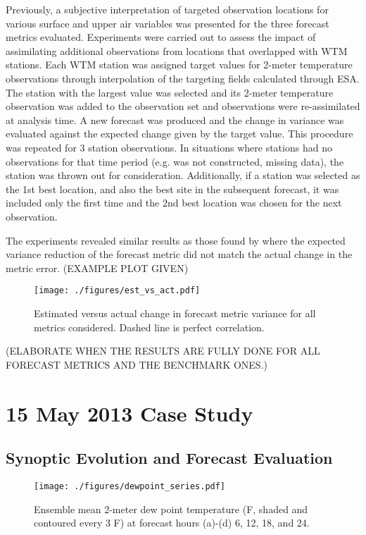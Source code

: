 \documentclass{ttuthes2007}
\newcommand{\tab}{\hspace*{2em}}  %
\begin{document}
\tab Previously, a subjective interpretation of targeted observation locations for various surface and upper air variables was presented for the three forecast metrics evaluated. Experiments were carried out to assess the impact of assimilating additional observations from locations that overlapped with WTM stations. Each WTM station was assigned target values for 2-meter temperature observations through interpolation of the targeting fields calculated through ESA. The station with the largest value was selected and its 2-meter temperature observation was added to the observation set and observations were re-assimilated at analysis time. A new forecast was produced and the change in variance was evaluated against the expected change given by the target value. This procedure was repeated for 3 station observations. In situations where stations had no observations for that time period (e.g. was not constructed, missing data), the station was thrown out for consideration. Additionally, if a station was selected as the 1st best location, and also the best site in the subsequent forecast, it was included only the first time and the 2nd best location was chosen for the next observation. 

\tab The experiments revealed similar results as those found by \cite{Hilletal2013} where the expected variance reduction of the forecast metric did not match the actual change in the metric error. (EXAMPLE PLOT GIVEN)

\begin{figure}[!tb]
  \centering
  \noindent\texttt{[image: ./figures/est\_vs\_act.pdf]}\\
  \caption{Estimated versus actual change in forecast metric variance for all metrics considered. Dashed line is perfect correlation. }
\label{est_vs_act}
\end{figure}

(ELABORATE WHEN THE RESULTS ARE FULLY DONE FOR ALL FORECAST METRICS AND THE BENCHMARK ONES.)

\chapter{15 May 2013 Case Study}

\section{Synoptic Evolution and Forecast Evaluation}

\begin{figure}[!b]
  \centering
  \noindent\texttt{[image: ./figures/dewpoint\_series.pdf]}\\
  \caption{Ensemble mean 2-meter dew point temperature (F, shaded and contoured every 3 F) at forecast hours (a)-(d) 6, 12, 18, and 24.}
\label{dewpoint_series}
\end{figure}
\end{document}

